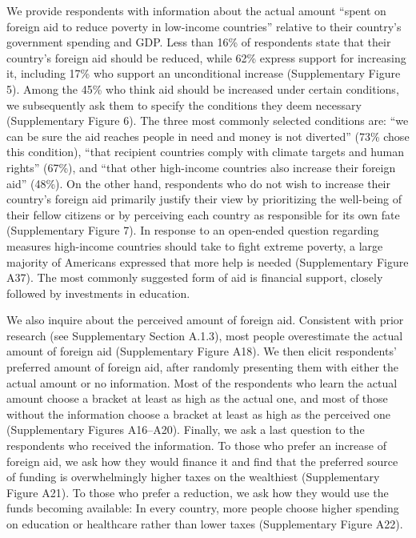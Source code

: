 \documentclass{nature}
\begin{document}
We provide respondents with information about the actual amount ``spent on foreign aid to reduce poverty in low-income countries'' relative to their country's government spending and GDP. Less than 16\% of respondents state that their country's foreign aid should be reduced, while 62\% express support for increasing it, including 17\% who support an unconditional increase (Supplementary Figure 5). Among the 45\% who think aid should be increased under certain conditions, we subsequently ask them to specify the conditions they deem necessary (Supplementary Figure 6). The three most commonly selected conditions are: ``we can be sure the aid reaches people in need and money is not diverted'' (73\% chose this condition), ``that recipient countries comply with climate targets and human rights'' (67\%), and ``that other high-income countries also increase their foreign aid'' (48\%). %
On the other hand, respondents who do not wish to increase their country's foreign aid primarily justify their view by prioritizing the well-being of their fellow citizens or by perceiving each country as responsible for its own fate (Supplementary Figure 7). In response to an open-ended question regarding measures high-income countries should take to fight extreme poverty, a large majority of Americans expressed that more help is needed (Supplementary Figure A37). The most commonly suggested form of aid is financial support, closely followed by investments in education. %


We also inquire about the perceived amount of foreign aid. Consistent with prior research (see Supplementary Section A.1.3), most people overestimate the actual amount of foreign aid (Supplementary Figure A18). We then elicit respondents' preferred amount of foreign aid, after randomly presenting them with either the actual amount or no information. Most of the respondents who learn the actual amount choose a bracket at least as high as the actual one, and most of those without the information choose a bracket at least as high as the perceived one (Supplementary Figures A16--A20). 
Finally, we ask a last question to the respondents who received the information. To those who prefer an increase of foreign aid, we ask how they would finance it and find that the preferred source of funding is overwhelmingly higher taxes on the wealthiest (Supplementary Figure A21). To those who prefer a reduction, we ask how they would use the funds becoming available: %
In every country, more people choose higher spending on education or healthcare rather than lower taxes (Supplementary Figure A22). %
\end{document}
